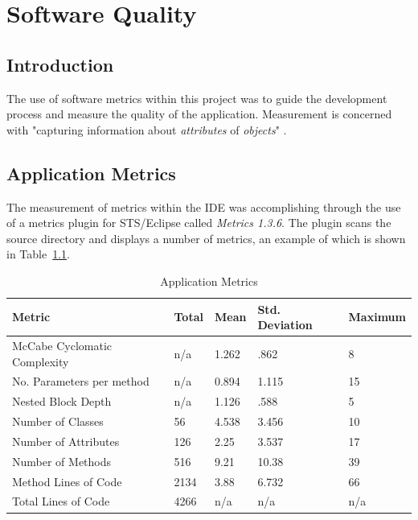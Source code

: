 \chapter{Software Quality}
\label{squality}

\section{Introduction}

The use of software metrics within this project was to guide the development process and measure the quality of the application. Measurement is concerned with "capturing information about \textit{attributes} of \textit{objects}" \parencite{softmetrics}.

\section{Application Metrics}

The measurement of metrics within the IDE was accomplishing through the use of a metrics plugin for STS/Eclipse called \textit{Metrics 1.3.6}. The plugin scans the source directory and displays a number of metrics, an example of which is shown in Table~\ref{fig:metricstable}. 

\begin{table}[H]
\begin{center}
    \begin{tabular}{| l | l | l | l | p{2.3cm} |}
    \hline
    Metric & Total & Mean & Std. Deviation & Maximum\\ \hline
	McCabe Cyclomatic Complexity & n/a & 1.262 & .862 & 8\\ \hline
	No. Parameters per method & n/a & 0.894 & 1.115 & 15\\ \hline
	Nested Block Depth & n/a & 1.126 & .588 & 5\\ \hline
	Number of Classes & 56 & 4.538 & 3.456 & 10\\ \hline
	Number of Attributes & 126 & 2.25 & 3.537 & 17\\ \hline
	Number of Methods& 516 & 9.21 & 10.38 & 39\\ \hline
	Method Lines of Code& 2134 & 3.88 & 6.732 & 66\\ \hline
	Total Lines of Code& 4266 & n/a & n/a & n/a\\ \hline
    \end{tabular}
\end{center}
\caption{Application Metrics}
\label{fig:metricstable}
\end{table}

